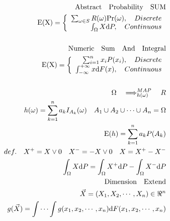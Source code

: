 \documentclass{article}
\begin{document}
\begin{align*}
    \mathrm{Abstract \quad Probability \quad SUM}\\
    \mathrm{E(X)} =
    \left\{
        \begin{array}{rl}
            \sum_{\omega \in S} R(\omega) \mathrm{Pr}(\omega) ,\quad Discrete\\ 
            \int_{\Omega} X \mathrm{d}P ,\quad Continuous
        \end{array}
    \right.\\ \quad \\ 
    \mathrm{Numeric \quad Sum \quad And \quad Integral}\\
    \mathrm{E(X)} =
    \left\{
        \begin{array}{rl}
            \sum_{i=1}^{n}x_{i}P(x_{i}),\quad Discrete\\ 
            \int_{-\infty}^{+\infty} x \mathrm{d}F(x) ,\quad Continuous
        \end{array}
    \right.\\
    \\
    \Omega \quad \Longrightarrow_{h(\omega)}^{MAP} \quad R \\
    h(\omega) = \sum_{k=1}^{n}a_{k}I_{A_{k}}(\omega) \quad A_{1} \cup A_{2} \cup \cdots \cup  A_{n} = \Omega \\
    \mathrm{E}(h) = \sum_{k=1}^{n} a_{k}P(A_{k}) \\
    def. \quad X^{+} = X \vee 0 \quad X^{-} = -X \vee 0 \quad X = X^{+} - X^{-} \\
    \int_{\Omega}X\mathrm{d}P = \int_{\Omega}X^{+}\mathrm{d}P - \int_{\Omega}X^{-}\mathrm{d}P \\
    \mathrm{Dimension \quad Extend} \\ 
    \vec{X} = (X_{1},X_{2}, \cdots , X_{n}) \in \Re^{n}\\
    g(\vec{X}) = \idotsint g(x_{1},x_{2}, \cdots ,x_{n})\mathrm{d}F(x_{1},x_{2}, \cdots ,x_{n}) \\
    \\
\end{align*}

\clearpage
\end{document}
